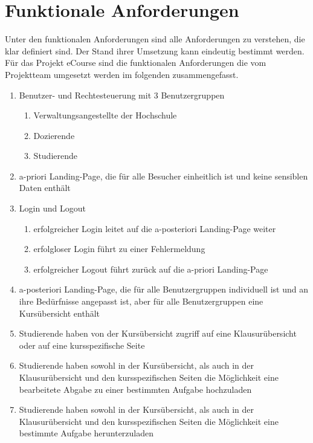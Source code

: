 
\chapter{Funktionale Anforderungen}
\label{sec:funktionale_Anforderungen}
Unter den funktionalen Anforderungen sind alle Anforderungen zu verstehen, die klar definiert sind. Der Stand ihrer Umsetzung kann eindeutig bestimmt werden. \\
Für das Projekt eCourse sind die funktionalen Anforderungen die vom Projektteam umgesetzt werden im folgenden zusammengefasst.\\
\begin{enumerate}
	\item Benutzer- und Rechtesteuerung mit 3 Benutzergruppen
	\begin{enumerate}
		\item Verwaltungsangestellte der Hochschule
		\item Dozierende
		\item Studierende
	\end{enumerate}
	\item a-priori Landing-Page, die für alle Besucher einheitlich ist und keine sensiblen Daten enthält
	\item Login und Logout
	\begin{enumerate}
		\item erfolgreicher Login leitet auf die a-posteriori Landing-Page weiter
		\item erfolgloser Login führt zu einer Fehlermeldung
		\item erfolgreicher Logout führt zurück auf die a-priori Landing-Page
	\end{enumerate}
	\item a-posteriori Landing-Page, die für alle Benutzergruppen individuell ist und an ihre Bedürfnisse angepasst ist, aber für alle Benutzergruppen eine Kursübersicht enthält
	\item Studierende haben von der Kursübersicht zugriff auf eine Klausurübersicht oder auf eine kursspezifische Seite
	\item Studierende haben sowohl in der Kursübersicht, als auch in der Klausurübersicht und den kursspezifischen Seiten die Möglichkeit eine bearbeitete Abgabe zu einer bestimmten Aufgabe hochzuladen
	\item Studierende haben sowohl in der Kursübersicht, als auch in der Klausurübersicht und den kursspezifischen Seiten die Möglichkeit eine bestimmte Aufgabe herunterzuladen

\end{enumerate}
